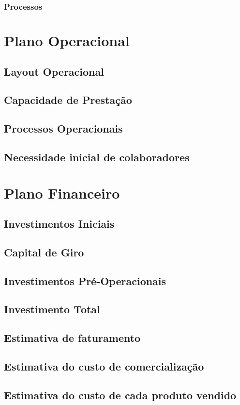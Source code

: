 \documentclass[a4paper, 12pt]{paper}
\begin{document}
\subsubsection{Processos}
\section{Plano Operacional}
\subsection{Layout Operacional}
\subsection{Capacidade de Prestação}
\subsection{Processos Operacionais}
\subsection{Necessidade inicial de colaboradores}
\section{Plano Financeiro}
\subsection{Investimentos Iniciais}
\subsection{Capital de Giro}
\subsection{Investimentos Pré-Operacionais}
\subsection{Investimento Total}
\subsection{Estimativa de faturamento}
\subsection{Estimativa do custo de comercialização}
\subsection{Estimativa do custo de cada produto vendido}
\end{document}

